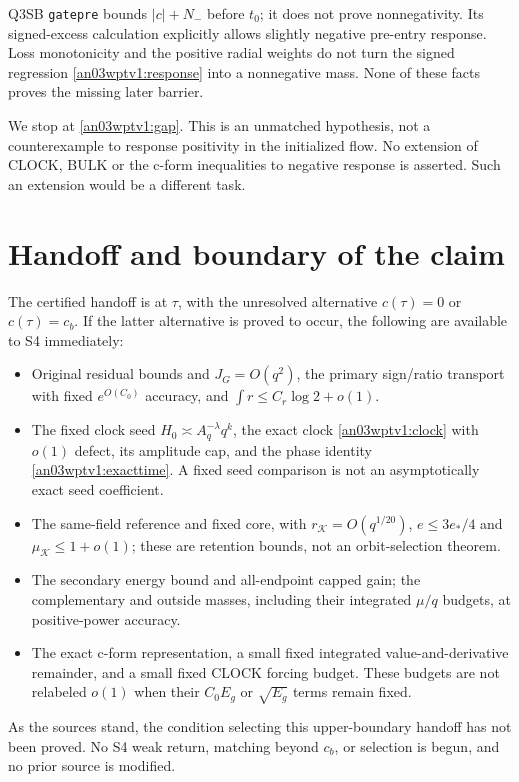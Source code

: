 \documentclass[11pt]{article}
\theoremstyle{remark}\newtheorem{remark}[theorem]{Remark}
\newcommand{\KK}{\mathcal K}
\begin{document}
Q3SB \texttt{gatepre} bounds $|c|+N_-$ before $t_0$; it does not
prove nonnegativity. Its signed-excess calculation explicitly allows
slightly negative pre-entry response. Loss monotonicity and the
positive radial weights do not turn the signed regression
\eqref{an03wptv1:response} into a nonnegative mass. None of these
facts proves the missing later barrier.

We stop at \eqref{an03wptv1:gap}. This is an unmatched hypothesis,
not a counterexample to response positivity in the initialized flow.
No extension of CLOCK, BULK or the c-form inequalities to negative
response is asserted. Such an extension would be a different task.

\section{Handoff and boundary of the claim}
The certified handoff is at $\tau$, with the unresolved alternative
$c(\tau)=0$ or $c(\tau)=c_b$. If the latter alternative is proved
to occur, the following are available to S4 immediately:
\begin{itemize}
 \item Original residual bounds and $J_G=O(q^2)$, the primary
 sign/ratio transport with fixed $e^{O(C_0)}$ accuracy, and
 $\int r\le C_r\log2+o(1)$.
 \item The fixed clock seed $H_0\asymp A_q^{-\lambda}q^k$, the
 exact clock \eqref{an03wptv1:clock} with $o(1)$ defect, its
 amplitude cap, and the phase identity \eqref{an03wptv1:exacttime}.
 A fixed seed comparison is not an asymptotically exact seed coefficient.
 \item The same-field reference and fixed core, with
 $r_{\KK}=O(q^{1/20})$, $e\le3e_*/4$ and
 $\mu_{\KK}\le1+o(1)$; these are retention bounds, not an
 orbit-selection theorem.
 \item The secondary energy bound and all-endpoint capped gain;
 the complementary and outside masses, including their integrated
 $\mu/q$ budgets, at positive-power accuracy.
 \item The exact c-form representation, a small fixed integrated
 value-and-derivative remainder, and a small fixed CLOCK forcing
 budget. These budgets are not relabeled $o(1)$ when their
 $C_0E_g$ or $\sqrt{E_g}$ terms remain fixed.
\end{itemize}
As the sources stand, the condition selecting this upper-boundary
handoff has not been proved. No S4 weak return, matching beyond
$c_b$, or selection is begun, and no prior source is modified.
\end{document}
